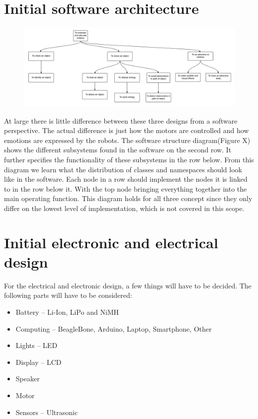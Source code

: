 \documentclass[11pt,twoside,a4paper]{report}
\begin{document}
\section{Initial software architecture}
\begin{figure}
\begin{center}
\includegraphics[width=16cm]{Images/FunctionalAnalysis.png}
\end{center}
\end{figure}
At large there is little difference between these three designs from a software perspective. The actual difference is just how the motors are controlled and how emotions are expressed by the robots. 
The software structure diagram(Figure X) shows the different subsystems found in the software on the second row. It further specifies the functionality of these subsystems in the row below. From this diagram we learn what the distribution of classes and namespaces should look like in the software. Each node in a row should implement the nodes it is linked to in the row below it. With the top node bringing everything together into the main operating function. This diagram holds for all three concept since they only differ on the lowest level of implementation, which is not covered in this scope.

\section{Initial electronic and electrical design}
For the electrical and electronic design, a few things will have to be decided. The following parts will have to be considered: 
\begin{itemize}
\item Battery -- Li-Ion, LiPo and NiMH
\item Computing -- BeagleBone, Arduino, Laptop, Smartphone, Other
\item Lights -- LED
\item Display -- LCD
\item Speaker
\item Motor
\item Sensors -- Ultrasonic
\end{itemize}
\end{document}
